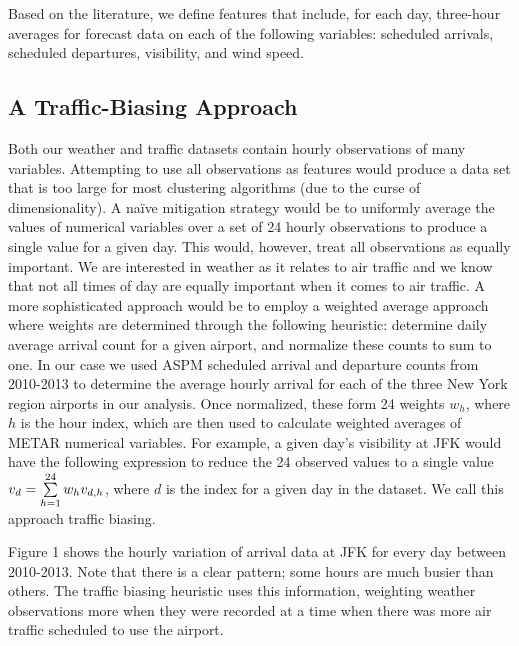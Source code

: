 \documentclass[11pt]{scrartcl}
\begin{document}
Based on the literature, we define features that include, for each day, three-hour averages for forecast data on each of the following variables: scheduled arrivals, scheduled departures, visibility, and wind speed.
 
\subsection{A Traffic-Biasing Approach}
Both our weather and traffic datasets contain hourly observations of many variables. Attempting to use all observations as features would produce a data set that is too large for most clustering algorithms (due to the curse of dimensionality).  A na{\"i}ve mitigation strategy would be to uniformly average the values of numerical variables over a set of 24 hourly observations to produce a single value for a given day.  This would, however, treat all observations as equally important.  We are interested in weather as it relates to air traffic and we know that not all times of day are equally important when it comes to air traffic.  A more sophisticated approach would be to employ a weighted average approach where weights are determined through the following heuristic: determine daily average arrival count for a given airport, and normalize these counts to sum to one.  In our case we used ASPM scheduled arrival and departure counts from 2010-2013 to determine the average hourly arrival for each of the three New York region airports in our analysis.  Once normalized, these form 24 weights $w_h$, where $h$ is the hour index, which are then used to calculate weighted averages of METAR numerical variables.  For example, a given day's visibility at JFK would have the following expression to reduce the 24 observed values to a single value $v_{d} = \sum_{h=1}^{24}\limits w_h v_{d,h}$, where $d$ is the index for a given day in the dataset.  We call this approach traffic biasing.

Figure 1 shows the hourly variation of arrival data at JFK for every day between 2010-2013.  Note that there is a clear pattern; some hours are much busier than others.  The traffic biasing heuristic uses this information, weighting weather observations more when they were recorded at a time when there was more air traffic scheduled to use the airport.
\newpage\noindent
\end{document}
